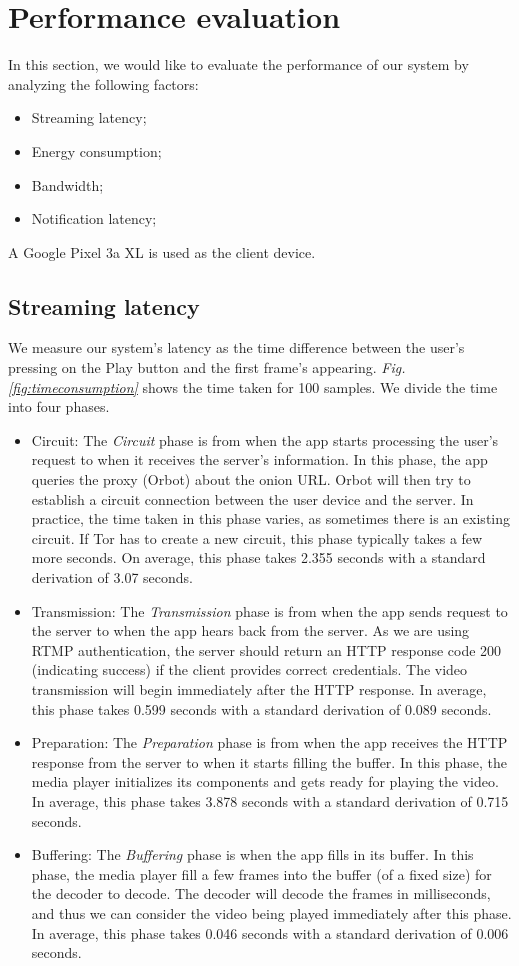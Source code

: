 \section{Performance evaluation}
In this section, we would like to evaluate the performance of our system by analyzing the following factors:
\begin{itemize}
	\item Streaming latency;
	\item Energy consumption;
	\item Bandwidth;
	\item Notification latency;
\end{itemize}

A Google Pixel 3a XL is used as the client device.

\subsection{Streaming latency}
\label{subsec:streaming_latency}
We measure our system's latency as the time difference between the user’s pressing on the Play button and the first frame’s appearing. \textit{Fig. \ref{fig:timeconsumption}} shows the time taken for 100 samples. We divide the time into four phases.
\begin{itemize}
	\item Circuit: The \textit{Circuit} phase is from when the app starts processing the user’s request to when it receives the server's information. In this phase, the app queries the proxy (Orbot) about the onion URL. Orbot will then try to establish a circuit connection between the user device and the server. In practice, the time taken in this phase varies, as sometimes there is an existing circuit. If Tor has to create a new circuit, this phase typically takes a few more seconds. On average, this phase takes 2.355 seconds with a standard derivation of 3.07 seconds.
	\item Transmission: The \textit{Transmission} phase is from when the app sends request to the server to when the app hears back from the server. As we are using RTMP authentication, the server should return an HTTP response code 200 (indicating success) if the client provides correct credentials. The video transmission will begin immediately after the HTTP response. In average, this phase takes 0.599 seconds with a standard derivation of 0.089 seconds.
	\item Preparation: The \textit{Preparation} phase is from when the app receives the HTTP response from the server to when it starts filling the buffer. In this phase, the media player initializes its components and gets ready for playing the video. In average, this phase takes 3.878 seconds with a standard derivation of 0.715 seconds.
	\item Buffering: The \textit{Buffering} phase is when the app fills in its buffer. In this phase, the media player fill a few frames into the buffer (of a fixed size) for the decoder to decode. The decoder will decode the frames in milliseconds, and thus we can consider the video being played immediately after this phase. In average, this phase takes 0.046 seconds with a standard derivation of 0.006 seconds.
\end{itemize}

